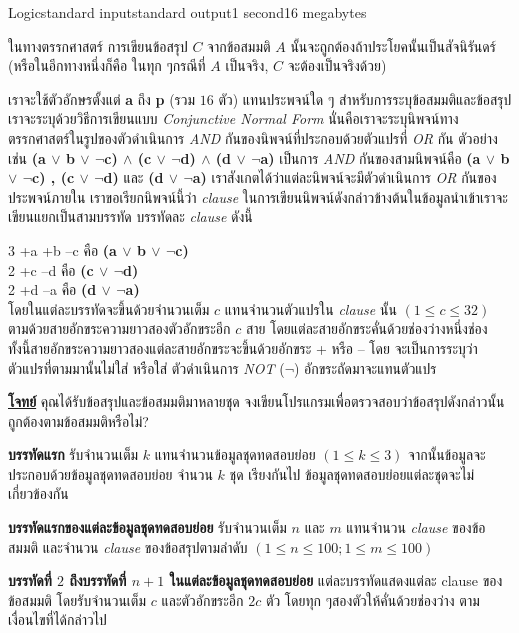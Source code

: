 \documentclass[11pt,a4paper]{article}
\begin{document}
\begin{problem}{Logic}{standard input}{standard output}{1 second}{16 megabytes}

ในทางตรรกศาสตร์ การเขียนข้อสรุป $C$ จากข้อสมมติ $A$ นั้นจะถูกต้องถ้าประโยคนั้นเป็นสัจนิรันดร์ (หรือในอีกทางหนึ่งก็คือ ในทุก ๆกรณีที่ $A$ เป็นจริง, $C$ จะต้องเป็นจริงด้วย)

เราจะใช้ตัวอักษรตั้งแต่ \textbf{a} ถึง \textbf{p} (รวม $16$ ตัว) แทนประพจน์ใด ๆ สำหรับการระบุข้อสมมติและข้อสรุปเราจะระบุด้วยวิธีการเขียนแบบ \textit{Conjunctive Normal Form} นั่นคือเราจะระบุนิพจน์ทางตรรกศาสตร์ในรูปของตัวดำเนินการ \textit{AND} กันของนิพจน์ที่ประกอบด้วยตัวแปรที่ \textit{OR} กัน  ตัวอย่างเช่น  \textbf{(a $\lor$ b $\lor$ $\neg$c) $\land$ (c $\lor$ $\neg$d) $\land$ (d $\lor$ $\neg$a)} เป็นการ \textit{AND} กันของสามนิพจน์คือ \textbf{(a $\lor$ b $\lor$ $\neg$c) , (c $\lor$ $\neg$d)} และ\textbf{ (d $\lor$ $\neg$a)} เราสังเกตได้ว่าแต่ละนิพจน์จะมีตัวดำเนินการ \textit{OR} กันของประพจน์ภายใน เราขอเรียกนิพจน์นี้ว่า \textit{clause} ในการเขียนนิพจน์ดังกล่าวข้างต้นในข้อมูลนำเข้าเราจะเขียนแยกเป็นสามบรรทัด บรรทัดละ \textit{clause} ดังนี้

3 +a +b –c  	คือ\textbf{ (a $\lor$ b $\lor$ $\neg$c)}\\
2 +c –d 		  คือ\textbf{ (c $\lor$ $\neg$d)}\\
2 +d –a    		  คือ\textbf{ (d $\lor$ $\neg$a)}\\

โดยในแต่ละบรรทัดจะขึ้นด้วยจำนวนเต็ม $c$ แทนจำนวนตัวแปรใน \textit{clause} นั้น  $(1 \leq c \leq 32)$ ตามด้วยสายอักขระความยาวสองตัวอักขระอีก $c$ สาย โดยแต่ละสายอักขระคั่นด้วยช่องว่างหนึ่งช่อง ทั้งนี้สายอักขระความยาวสองแต่ละสายอักขระจะขึ้นด้วยอักขระ + หรือ – โดย จะเป็นการระบุว่าตัวแปรที่ตามมานั้นไม่ใส่ หรือใส่ ตัวดำเนินการ \textit{NOT} ($\neg$)  อักขระถัดมาจะแทนตัวแปร

\bigskip
\underline{\textbf{โจทย์}}  คุณได้รับข้อสรุปและข้อสมมติมาหลายชุด จงเขียนโปรแกรมเพื่อตรวจสอบว่าข้อสรุปดังกล่าวนั้น ถูกต้องตามข้อสมมติหรือไม่?

\InputFile

\textbf{บรรทัดแรก} รับจำนวนเต็ม $k$ แทนจำนวนข้อมูลชุดทดสอบย่อย $(1 \leq k \leq 3)$  จากนั้นข้อมูลจะประกอบด้วยข้อมูลชุดทดสอบย่อย จำนวน $k$ ชุด เรียงกันไป   ข้อมูลชุดทดสอบย่อยแต่ละชุดจะไม่เกี่ยวข้องกัน

\textbf{บรรทัดแรกของแต่ละข้อมูลชุดทดสอบย่อย} รับจำนวนเต็ม $n$ และ $m$ แทนจำนวน \textit{clause} ของข้อสมมติ และจำนวน \textit{clause} ของข้อสรุปตามลำดับ $(1\leq n \leq 100; 1 \leq m \leq 100)$

\textbf{บรรทัดที่ $2$ ถึงบรรทัดที่ $n+1$ ในแต่ละข้อมูลชุดทดสอบย่อย} แต่ละบรรทัดแสดงแต่ละ clause ของข้อสมมติ  โดยรับจำนวนเต็ม $c$ และตัวอักขระอีก $2c$ ตัว โดยทุก ๆสองตัวให้คั่นด้วยช่องว่าง ตามเงื่อนไขที่ได้กล่าวไป


\end{problem}
\end{document}
